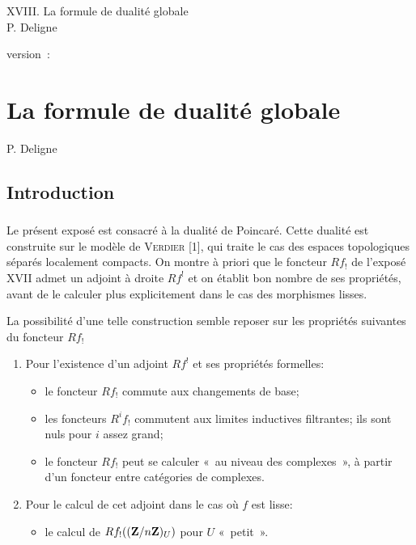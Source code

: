 \documentclass[10pt]{../fichiers-configuration-latex/smfart}
\begin{document}
\begin{center}
XVIII. La formule de dualité globale \\
P. Deligne 
\end{center}

version : \showgitstatus{}
\tableofcontents

\else
\chapter{La formule de dualité globale}
\begin{center}
P. Deligne 
\end{center}
\fi

\setcounter{pageoriginal}{480}
\newcommand{\acorriger}[1]{\nde{#1}}

\setcounter{section}{-1}
\section{Introduction}\pageoriginale

\subsection{}
Le présent exposé est consacré à la dualité de Poincaré. Cette dualité est
construite sur le modèle de \textsc{Verdier} [1], qui traite le cas des espaces
topologiques séparés localement compacts. On montre à priori que le
foncteur $Rf_{!}$ de l'exposé XVII admet un adjoint à droite $Rf^{!}$
et on établit bon nombre de ses propriétés, avant de le calculer plus
explicitement dans le cas des morphismes lisses.

La possibilité d'une telle construction semble reposer sur les
propriétés suivantes du foncteur $Rf_{!}$
\begin{enumerate}
\renewcommand{\theenumi}{\alph{enumi}}
\renewcommand{\labelenumi}{\theenumi)}
\item Pour l'existence d'un adjoint $Rf^{!}$ et ses propriétés
  formelles:
\begin{itemize}
\item[(I)] le foncteur $Rf_{!}$ commute aux changements de base;

\item[(II)] les foncteurs $R^{i}f_{!}$ commutent aux limites
  inductives filtrantes; ils sont nuls pour $i$ assez grand;

\item[(III)] le foncteur $Rf_{!}$ peut se calculer « au niveau des
  complexes », \ie à partir d'un foncteur entre catégories de
  complexes.
\end{itemize}

\item Pour le calcul de cet adjoint dans le cas où $f$ est lisse:
\begin{itemize}
\item[(IV)] le calcul de $Rf_{!}((\mathbf{Z}/n\mathbf{Z})_{U})$ pour
  $U$ « petit ».
\end{itemize}
\end{enumerate}
\end{document}

